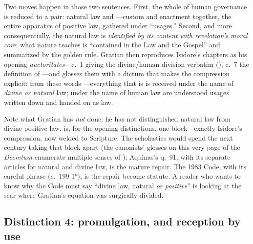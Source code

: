 Two moves happen in those two sentences. First, the whole of human governance is reduced to a pair: natural law and ---custom and enactment together, the entire apparatus of positive law, gathered under ``usages.'' Second, and more consequentially, the natural law is \emph{identified by its content with revelation's moral core}: what nature teaches is ``contained in the Law and the Gospel'' and summarized by the golden rule. Gratian then reproduces Isidore's chapters as his opening \emph{auctoritates}---c.~1 giving the divine/human division verbatim (), c.~7 the definition of ---and glosses them with a dictum that makes the compression explicit: from these words ---everything that is  is received under the name of \emph{divine or natural} law; under the name of human law are understood usages written down and handed on as law.

Note what Gratian has \emph{not} done: he has not distinguished natural law from divine positive law.  is, for the opening distinctions, one block---exactly Isidore's compression, now welded to Scripture. The scholastics would spend the next century taking that block apart (the canonists' glosses on this very page of the \emph{Decretum} enumerate multiple senses of ); Aquinas's q.~91, with its separate articles for natural and divine law, is the mature repair. The 1983 Code, with its careful phrase  (c.~199 1°), is the repair become statute. A reader who wants to know why the Code must say ``divine law, natural \emph{or positive}'' is looking at the scar where Gratian's equation was surgically divided.

\subsection{Distinction 4: promulgation, and reception by use}

